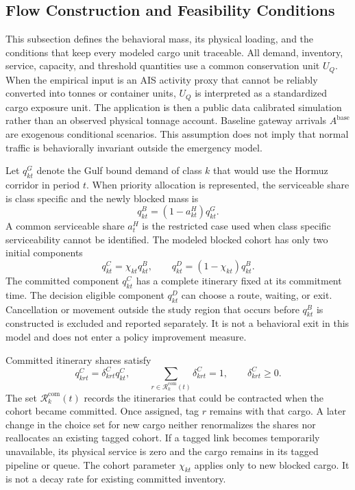\documentclass[a4paper,fleqn]{cas-sc}
\begin{document}
\subsection{Flow Construction and Feasibility Conditions}
\label{subsec:flow}

This subsection defines the behavioral mass, its physical loading, and the
conditions that keep every modeled cargo unit traceable. All demand, inventory,
service, capacity, and threshold quantities use a common conservation unit
$U_Q$. When the empirical input is an AIS activity proxy that cannot be
reliably converted into tonnes or container units, $U_Q$ is interpreted as a
standardized cargo exposure unit. The application is then a public data
calibrated simulation rather than an observed physical tonnage account.
Baseline gateway arrivals $A^{\mathrm{base}}$ are exogenous conditional
scenarios. This assumption does not imply that normal traffic is behaviorally
invariant outside the emergency model.

Let $q^G_{kt}$ denote the Gulf bound demand of class $k$ that would use the
Hormuz corridor in period $t$. When priority allocation is represented, the
serviceable share is class specific and the newly blocked mass is
\begin{equation}
 q^B_{kt}=(1-a^H_{kt})q^G_{kt}.
 \label{eq:blocked-flow}
\end{equation}
A common serviceable share $a^H_t$ is the restricted case used when class
specific serviceability cannot be identified. The modeled blocked cohort has
only two initial components
\begin{equation}
 q^C_{kt}=\chi_{kt}q^B_{kt},\qquad
 q^D_{kt}=(1-\chi_{kt})q^B_{kt}.
 \label{eq:commitment-split}
\end{equation}
The committed component $q^C_{kt}$ has a complete itinerary fixed at its
commitment time. The decision eligible component $q^D_{kt}$ can choose a route,
waiting, or exit. Cancellation or movement outside the study region that
occurs before $q^B_{kt}$ is constructed is excluded and reported separately.
It is not a behavioral exit in this model and does not enter a policy
improvement measure.

Committed itinerary shares satisfy
\begin{equation}
 q^C_{krt}=\delta^C_{krt}q^C_{kt},\qquad
 \sum_{r\in\mathcal R_k^{\mathrm{com}}(t)}
 \delta^C_{krt}=1,\qquad \delta^C_{krt}\ge0.
 \label{eq:committed-route-share}
\end{equation}
The set $\mathcal R_k^{\mathrm{com}}(t)$ records the itineraries that could be
contracted when the cohort became committed. Once assigned, tag $r$ remains
with that cargo. A later change in the choice set for new cargo neither
renormalizes the shares nor reallocates an existing tagged cohort. If a tagged
link becomes temporarily unavailable, its physical service is zero and the
cargo remains in its tagged pipeline or queue. The cohort parameter
$\chi_{kt}$ applies only to new blocked cargo. It is not a decay rate for
existing committed inventory.
\end{document}
